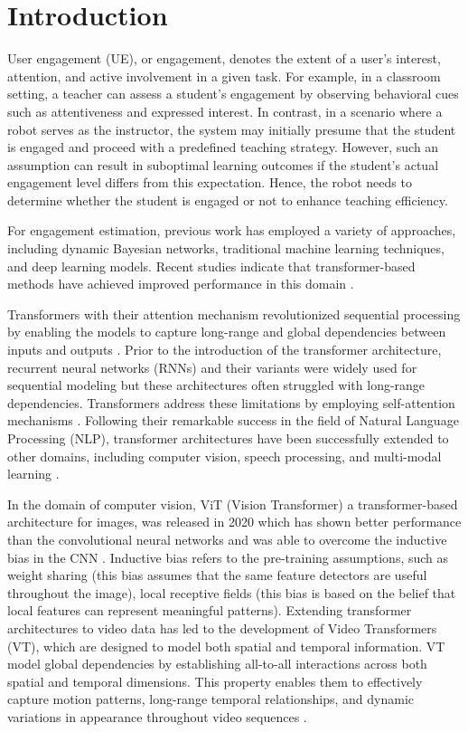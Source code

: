 \documentclass[report.tex]{subfiles}
\begin{document}
    \chapter{Introduction}

User engagement (UE), or engagement, denotes the extent of a user’s interest, attention, and active involvement in a given task. For example, in a classroom setting, a teacher can assess a student’s engagement by observing behavioral cues such as attentiveness and expressed interest. In contrast, in a scenario where a robot serves as the instructor, the system may initially presume that the student is engaged \cite{chin2014impact} and proceed with a predefined teaching strategy. However, such an assumption can result in suboptimal learning outcomes if the student’s actual engagement level differs from this expectation. Hence, the robot needs to determine whether the student is engaged or not to enhance teaching efficiency. 

For engagement estimation, previous work has employed a variety of approaches, including dynamic Bayesian networks, traditional machine learning techniques, and deep learning models. Recent studies indicate that transformer-based methods have achieved improved performance in this domain \cite{mandia2025transformer}.

Transformers with their attention mechanism revolutionized sequential processing by enabling the models to capture long-range and global dependencies between inputs and outputs \cite{vaswani2017attention}. Prior to the introduction of the transformer architecture, recurrent neural networks (RNNs) and their variants were widely used for sequential modeling but these architectures often struggled with long-range dependencies. Transformers address these limitations by employing self-attention mechanisms \cite{vaswani2017attention}. Following their remarkable success in the field of Natural Language Processing (NLP), transformer architectures have been successfully extended to other domains, including computer vision, speech processing, and multi-modal learning \cite{jamil2023comprehensive}.

In the domain of computer vision, ViT (Vision Transformer) a transformer-based architecture for images, was released in 2020 which has shown better performance than the convolutional neural networks and was able to overcome the inductive bias in the CNN \cite{jamil2023comprehensive}. Inductive bias refers to the pre-training assumptions, such as weight sharing (this bias assumes that the same feature detectors are useful throughout the image), local receptive fields (this bias is based on the belief that local features can represent meaningful patterns). Extending transformer architectures to video data has led to the development of Video Transformers (VT), which are designed to model both spatial and temporal information. VT model global dependencies by establishing all-to-all interactions across both spatial and temporal dimensions. This property enables them to effectively capture motion patterns, long-range temporal relationships, and dynamic variations in appearance throughout video sequences \cite{khan2022transformers}.
\end{document}
